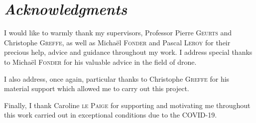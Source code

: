 \chapter*{\centering \normalfont\textit{Acknowledgments}}
\markboth{}{}

\begin{itshape}
    \hspace{\parindent} I would like to warmly thank my supervisors, Professor Pierre \textsc{Geurts} and Christophe \textsc{Greffe}, as well as Michaël \textsc{Fonder} and Pascal \textsc{Leroy} for their precious help, advice and guidance throughout my work. I address special thanks to Michaël \textsc{Fonder} for his valuable advice in the field of drone.

    I also address, once again, particular thanks to Christophe \textsc{Greffe} for his material support which allowed me to carry out this project.

    Finally, I thank Caroline \textsc{le Paige} for supporting and motivating me throughout this work carried out in exceptional conditions due to the COVID-19.
\end{itshape}

\restoregeometry
